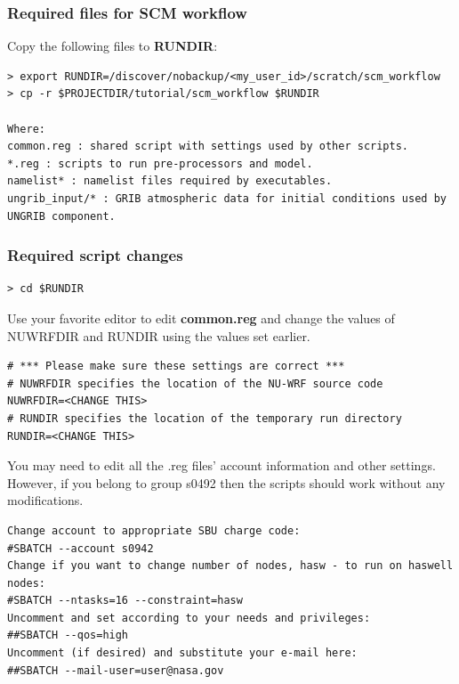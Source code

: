 \begin{frame}[fragile]\frametitle{Required files for SCM workflow}

Copy the following files to \textbf{RUNDIR}:
\begin{lstlisting}
> export RUNDIR=/discover/nobackup/<my_user_id>/scratch/scm_workflow
> cp -r $PROJECTDIR/tutorial/scm_workflow $RUNDIR

Where:
common.reg : shared script with settings used by other scripts.
*.reg : scripts to run pre-processors and model.
namelist* : namelist files required by executables.
ungrib_input/* : GRIB atmospheric data for initial conditions used by UNGRIB component.
\end{lstlisting}

\end{frame}

\begin{frame}[fragile]
\frametitle{Required script changes}
\verbatimfont{\scriptsize}%
\begin{verbatim}
> cd $RUNDIR
\end{verbatim}
 Use your favorite editor to edit \textbf{common.reg} and change the values of NUWRFDIR and RUNDIR using the values set earlier.
\verbatimfont{\scriptsize}%
\begin{verbatim}
# *** Please make sure these settings are correct ***
# NUWRFDIR specifies the location of the NU-WRF source code
NUWRFDIR=<CHANGE THIS>
# RUNDIR specifies the location of the temporary run directory
RUNDIR=<CHANGE THIS>
\end{verbatim}
You may need to edit all the .reg files' account information and other settings. However, if you belong to group s0492 then the scripts should work without any modifications.
\verbatimfont{\scriptsize}%
\begin{verbatim}
Change account to appropriate SBU charge code:
#SBATCH --account s0942 
Change if you want to change number of nodes, hasw - to run on haswell nodes:
#SBATCH --ntasks=16 --constraint=hasw
Uncomment and set according to your needs and privileges:
##SBATCH --qos=high 
Uncomment (if desired) and substitute your e-mail here:
##SBATCH --mail-user=user@nasa.gov 
\end{verbatim}

\end{frame}

